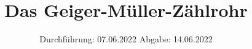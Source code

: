 

\subject{V703}
\title{Das Geiger-Müller-Zählrohr}
\date{%
  Durchführung: 07.06.2022
  \hspace{3em}
  Abgabe: 14.06.2022
}



\maketitle
\thispagestyle{empty}
\tableofcontents
\newpage






\printbibliography{}

%


